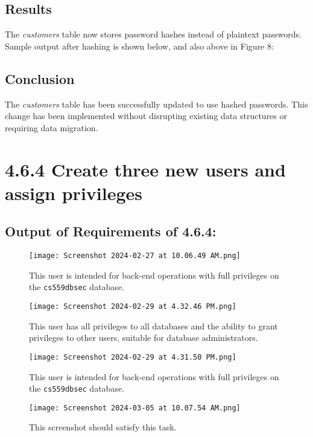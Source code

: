 \documentclass{article}
\begin{document}
\subsection*{Results}
The \textit{customers} table now stores password hashes instead of plaintext passwords. Sample output after hashing is shown below, and also above in Figure 8:



\subsection*{Conclusion}
The \textit{customers} table has been successfully updated to use hashed passwords. This change has been implemented without disrupting existing data structures or requiring data migration.

\section*{4.6.4 Create three new users and assign privileges}

\subsection*{Output of Requirements of 4.6.4:}
\begin{figure}[H]
    \centering
    \texttt{[image: Screenshot 2024-02-27 at 10.06.49 AM.png]}
    \caption{This user is intended for back-end operations with full privileges on the \texttt{cs559dbsec} database.}
\end{figure}

\begin{figure}[H]
    \centering
    \texttt{[image: Screenshot 2024-02-29 at 4.32.46 PM.png]}
    \caption{This user has all privileges to all databases and the ability to grant privileges to other users, suitable for database administrators.}
\end{figure}

\begin{figure}[H]
    \centering
    \texttt{[image: Screenshot 2024-02-29 at 4.31.50 PM.png]}
    \caption{This user is intended for back-end operations with full privileges on the \texttt{cs559dbsec} database.}
\end{figure}

\begin{figure}[H]
    \centering
    \texttt{[image: Screenshot 2024-03-05 at 10.07.54 AM.png]}
    \caption{This screenshot should satisfy this task. }
\end{figure}
\end{document}
